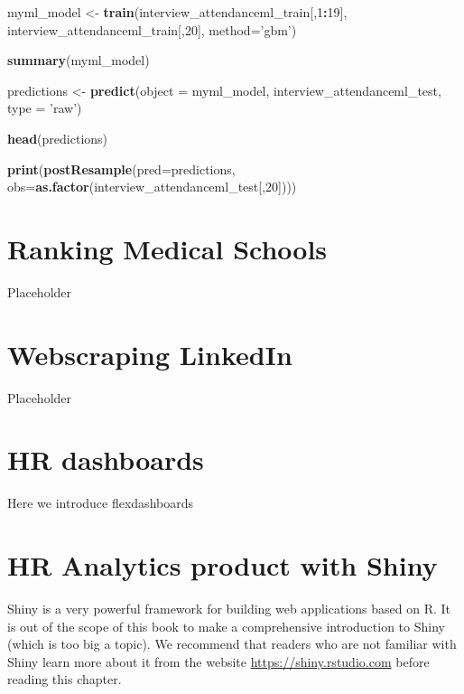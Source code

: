 \documentclass[12pt, krantz2,]{krantz}
\makeatletter
\newenvironment{Shaded}{\begin{snugshade}}{\end{snugshade}}
\newcommand{\DataTypeTok}[1]{\textcolor[rgb]{0.27,0.27,0.27}{#1}}
\newcommand{\DecValTok}[1]{\textcolor[rgb]{0.06,0.06,0.06}{#1}}
\newcommand{\KeywordTok}[1]{\textcolor[rgb]{0.27,0.27,0.27}{\textbf{#1}}}
\newcommand{\NormalTok}[1]{#1}
\newcommand{\OperatorTok}[1]{\textcolor[rgb]{0.43,0.43,0.43}{\textbf{#1}}}
\newcommand{\StringTok}[1]{\textcolor[rgb]{0.5,0.5,0.5}{#1}}
\newenvironment{kframe}{%
\medskip{}
\setlength{\fboxsep}{.8em}
 \def\at@end@of@kframe{}%
 \ifinner\ifhmode%
  \def\at@end@of@kframe{\end{minipage}}%
  \begin{minipage}{\columnwidth}%
 \fi\fi%
 \def\FrameCommand##1{\hskip\@totalleftmargin \hskip-\fboxsep
 \colorbox{shadecolor}{##1}\hskip-\fboxsep
     \hskip-\linewidth \hskip-\@totalleftmargin \hskip\columnwidth}%
 \MakeFramed {\advance\hsize-\width
   \@totalleftmargin\z@ \linewidth\hsize
   \@setminipage}}%
 {\par\unskip\endMakeFramed%
 \at@end@of@kframe}
\renewenvironment{Shaded}{\begin{kframe}}{\end{kframe}}
\makeatother
\begin{document}
\begin{Shaded}
\begin{Highlighting}[]
\NormalTok{myml_model <-}\StringTok{ }\KeywordTok{train}\NormalTok{(interview_attendanceml_train[,}\DecValTok{1}\OperatorTok{:}\DecValTok{19}\NormalTok{], interview_attendanceml_train[,}\DecValTok{20}\NormalTok{], }\DataTypeTok{method=}\StringTok{'gbm'}\NormalTok{)}

\KeywordTok{summary}\NormalTok{(myml_model)}

\NormalTok{predictions <-}\StringTok{ }\KeywordTok{predict}\NormalTok{(}\DataTypeTok{object =}\NormalTok{ myml_model, interview_attendanceml_test,}
                       \DataTypeTok{type =} \StringTok{'raw'}\NormalTok{)}

\KeywordTok{head}\NormalTok{(predictions)}

\KeywordTok{print}\NormalTok{(}\KeywordTok{postResample}\NormalTok{(}\DataTypeTok{pred=}\NormalTok{predictions, }\DataTypeTok{obs=}\KeywordTok{as.factor}\NormalTok{(interview_attendanceml_test[,}\DecValTok{20}\NormalTok{])))}
\end{Highlighting}
\end{Shaded}

\hypertarget{ranking-medical_school}{%
\chapter{Ranking Medical Schools}\label{ranking-medical_school}}

Placeholder

\hypertarget{webscraping-linkedin}{%
\chapter{Webscraping LinkedIn}\label{webscraping-linkedin}}

Placeholder

\hypertarget{flexdashboards}{%
\chapter{HR dashboards}\label{flexdashboards}}

Here we introduce flexdashboards

\hypertarget{shiny}{%
\chapter{HR Analytics product with Shiny}\label{shiny}}

Shiny is a very powerful framework for building web applications based on R. It is out of the scope of this book to make a comprehensive introduction to Shiny (which is too big a topic). We recommend that readers who are not familiar with Shiny learn more about it from the website \url{https://shiny.rstudio.com} before reading this chapter.
\end{document}
